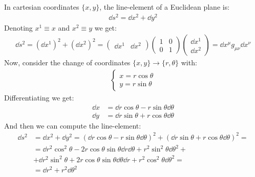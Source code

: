\documentclass[../template.tex]{subfiles}
\begin{document}
\begin{example}
    In cartesian coordinates $\{x, y\}$, the line-element of a Euclidean plane is:
    \begin{align*}
        \dd{s}^2 = \dd{x}^2 + \dd{y}^2
    \end{align*} 
    Denoting $x^1 \equiv x$ and $x^2 \equiv y$ we get:
    \begin{align*}
        \dd{s}^2 = (\dd{x^1})^2 + (\dd{x^2})^2 = \left(\begin{array}{cc}
        \dd{x^1} & \dd{x^2}
        \end{array}\right)
        \left(\begin{array}{cc}
        1 & 0 \\ 
        0 & 1
        \end{array}\right)
        \left(\begin{array}{c}
        \dd{x^1} \\ 
        \dd{x^2}
        \end{array}\right) = \dd{x^\mu} g_{\mu \nu} \dd{x^\nu}
    \end{align*}  
    Now, consider the change of coordinates $\{x,y\} \to \{r, \theta\}$ with:
    \begin{align*}
        \begin{cases}
            x = r \cos \theta\\
            y = r \sin \theta
        \end{cases}
    \end{align*}
    Differentiating we get:
    \begin{align*}
        \dd{x} &= \dd{r} \cos \theta - r \sin \theta \dd{\theta}\\
        \dd{y} &= \dd{r} \sin\theta + r \cos\theta \dd{\theta}
    \end{align*}
    And then we can compute the line-element:
    \begin{align*}
        \dd{s}^2 &= \dd{x}^2 + \dd{y}^2 = (\dd{r}\cos \theta - r \sin \theta \dd{\theta})^2 + (\dd{r} \sin \theta + r \cos \theta \dd{\theta})^2 = \\
        &= \dd{r}^2 \cos^2 \theta - 2 r \cos \theta \sin \theta \dd{r} \dd{\theta} + r^2 \sin^2 \theta \dd{\theta}^2 +\\
        &+ \dd{r}^2 \sin^2 \theta + 2r \cos \theta \sin \theta \dd{\theta} \dd{r} + r^2 \cos^2 \theta \dd{\theta}^2 = \\
        &= \dd{r}^2 + r^2 \dd{\theta}^2 
    \end{align*}

\end{example}
\end{document}
